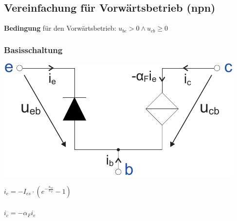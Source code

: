 \documentclass[a4paper,twocolumn,10pt]{article}
\begin{document}
\subsection*{Vereinfachung für Vorwärtsbetrieb (npn)}
\textbf{Bedingung} für den Vorwärtsbetrieb: $u_{be}>0 \wedge u_{cb}\geq 0$
\subsubsection*{Basisschaltung}
\begin{minipage}[b]{0.23\textwidth}
\includegraphics[width=\textwidth]{img/Basisschaltung_Vereinfachung}\\
\end{minipage}
\hfill
\begin{minipage}[b]{0.23\textwidth}
$i_e=-I_{es}\cdot (e^{-\frac{u_{eb}}{U_T}}-1)$\\\\
$i_c=-\alpha_Fi_e$\\\\
\end{minipage}
\end{document}
